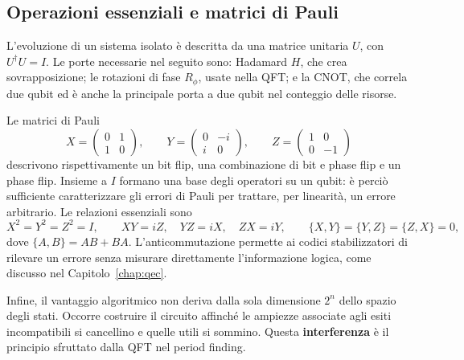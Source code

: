 \begin{onehalfspace}
\subsection{Operazioni essenziali e matrici di Pauli}

L'evoluzione di un sistema isolato è descritta da una matrice unitaria $U$, con $U^{\dagger}U=I$. Le porte necessarie nel seguito sono: Hadamard $H$, che crea sovrapposizione; le rotazioni di fase $R_{\phi}$, usate nella \ac{QFT}; e la \ac{CNOT}, che correla due qubit ed è anche la principale porta a due qubit nel conteggio delle risorse.

Le matrici di Pauli
\[
    X=\begin{pmatrix}0&1\\1&0\end{pmatrix},\qquad
    Y=\begin{pmatrix}0&-i\\i&0\end{pmatrix},\qquad
    Z=\begin{pmatrix}1&0\\0&-1\end{pmatrix}
\]
descrivono rispettivamente un bit flip, una combinazione di bit e phase flip e un phase flip. Insieme a $I$ formano una base degli operatori su un qubit: è perciò sufficiente caratterizzare gli errori di Pauli per trattare, per linearità, un errore arbitrario. Le relazioni essenziali sono
\begin{equation}
    X^{2}=Y^{2}=Z^{2}=I,\qquad
    XY=iZ,\quad YZ=iX,\quad ZX=iY,\qquad
    \{X,Y\}=\{Y,Z\}=\{Z,X\}=0,
    \label{eq:algebra_pauli}
\end{equation}
dove $\{A,B\}=AB+BA$. L'anticommutazione permette ai codici stabilizzatori di rilevare un errore senza misurare direttamente l'informazione logica, come discusso nel Capitolo~\ref{chap:qec}.

Infine, il vantaggio algoritmico non deriva dalla sola dimensione $2^{n}$ dello spazio degli stati. Occorre costruire il circuito affinché le ampiezze associate agli esiti incompatibili si cancellino e quelle utili si sommino. Questa \textbf{interferenza} è il principio sfruttato dalla \ac{QFT} nel period finding.

\end{onehalfspace}
